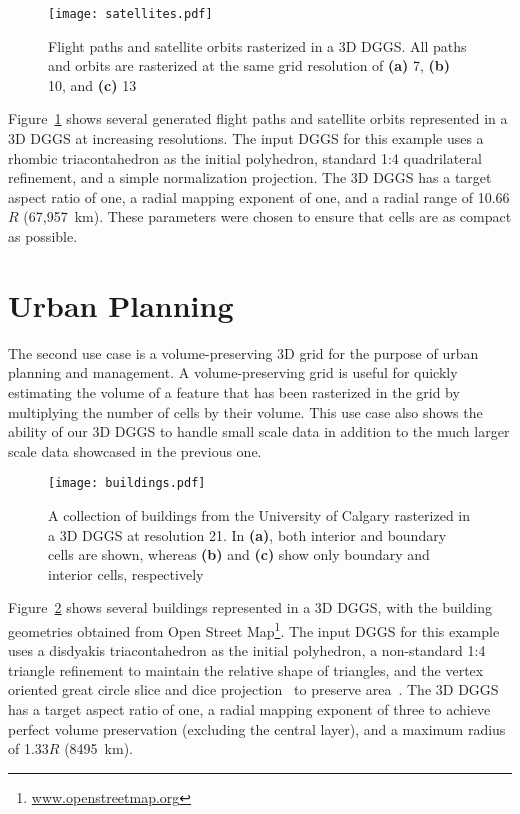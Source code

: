 \begin{figure}[h]
	\centering
	\texttt{[image: satellites.pdf]}
	\caption{Flight paths and satellite orbits rasterized in a 3D DGGS.
		All paths and orbits are rasterized at the same grid resolution of \textbf{(a)} 7, \textbf{(b)} 10, and \textbf{(c)} 13}
	\label{fig:satellites}
\end{figure}


Figure~\ref{fig:satellites} shows several generated flight paths and satellite orbits represented in a 3D DGGS at increasing resolutions.
The input DGGS for this example uses a rhombic triacontahedron as the initial polyhedron, standard 1:4 quadrilateral refinement, and a simple normalization projection.
The 3D DGGS has a target aspect ratio of one, a radial mapping exponent of one, and a radial range of 10.66$R$ (67,957~km).
These parameters were chosen to ensure that cells are as compact as possible.

\section{Urban Planning}
The second use case is a volume-preserving 3D grid for the purpose of urban planning and management.
A volume-preserving grid is useful for quickly estimating the volume of a feature that has been rasterized in the grid by multiplying the number of cells by their volume.
This use case also shows the ability of our 3D DGGS to handle small scale data in addition to the much larger scale data showcased in the previous one.


\begin{figure}[h]
	\centering
	\texttt{[image: buildings.pdf]}
	\caption{A collection of buildings from the University of Calgary rasterized in a 3D DGGS at resolution 21.
		In \textbf{(a)}, both interior and boundary cells are shown, whereas \textbf{(b)} and \textbf{(c)} show only boundary and interior cells, respectively}
	\label{fig:urbanplanning}
\end{figure}


Figure~\ref{fig:urbanplanning} shows several buildings represented in a 3D DGGS, with the building geometries obtained from Open Street Map\footnote{\url{www.openstreetmap.org}}.
The input DGGS for this example uses a disdyakis triacontahedron as the initial polyhedron, a non-standard 1:4 triangle refinement to maintain the relative shape of triangles, and the vertex oriented great circle slice and dice projection~\cite{van2006slice} to preserve area~\cite{hallDT}.
The 3D DGGS has a target aspect ratio of one, a radial mapping exponent of three to achieve perfect volume preservation (excluding the central layer), and a maximum radius of 1.33$R$ (8495~km).


